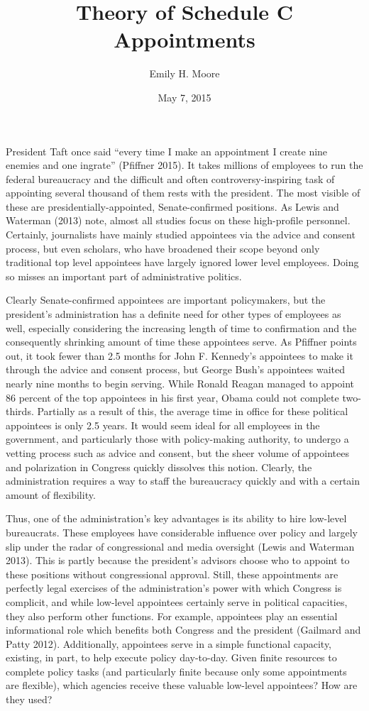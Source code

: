\documentclass[12pt]{article}
\title{Theory of Schedule C Appointments}
\date{May 7, 2015}
\author{Emily H. Moore}
\begin{document}

\maketitle
\parindent=0.5in
\parskip=0.01in
\doublespacing

President Taft once said ``every time I make an appointment I create nine enemies and one ingrate'' (Pfiffner 2015). It takes millions of employees to run the federal bureaucracy and the difficult and often controversy-inspiring task of appointing several thousand of them rests with the president. The most visible of these are presidentially-appointed, Senate-confirmed positions. As Lewis and Waterman (2013) note, almost all studies focus on these high-profile personnel. Certainly, journalists have mainly studied appointees via the advice and consent process, but even scholars, who have broadened their scope beyond only traditional top level appointees have largely ignored lower level employees. Doing so misses an important part of administrative politics. 

Clearly Senate-confirmed appointees are important policymakers, but the president's administration has a definite need for other types of employees as well, especially considering the increasing length of time to confirmation and the consequently shrinking amount of time these appointees serve. As Pfiffner points out, it took fewer than 2.5 months for John F. Kennedy's appointees to make it through the advice and consent process, but George Bush's appointees waited nearly nine months to begin serving. While Ronald Reagan managed to appoint 86 percent of the top appointees in his first year, Obama could not complete two-thirds. Partially as a result of this, the average time in office for these political appointees is only 2.5 years. It would seem ideal for all employees in the government, and particularly those with policy-making authority, to undergo a vetting process such as advice and consent, but the sheer volume of appointees and polarization in Congress quickly dissolves this notion. Clearly, the administration requires a way to staff the bureaucracy quickly and with a certain amount of flexibility.

Thus, one of the administration's key advantages is its ability to hire low-level bureaucrats. These employees have considerable influence over policy and largely slip under the radar of congressional and media oversight (Lewis and Waterman 2013). This is partly because the president's advisors choose who to appoint to these positions without congressional approval. Still, these appointments are perfectly legal exercises of the administration's power with which Congress is complicit, and while low-level appointees certainly serve in political capacities, they also perform other functions. For example, appointees play an essential informational role which benefits both Congress and the president (Gailmard and Patty 2012). Additionally, appointees serve in a simple functional capacity, existing, in part, to help execute policy day-to-day. Given finite resources to complete policy tasks (and particularly finite because only some appointments are flexible), which agencies receive these valuable low-level appointees? How are they used?
\end{document}
